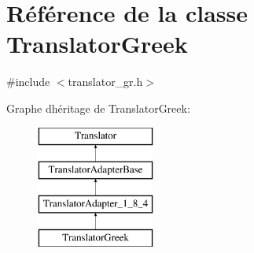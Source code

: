 \hypertarget{class_translator_greek}{}\section{Référence de la classe Translator\+Greek}
\label{class_translator_greek}


{\ttfamily \#include $<$translator\+\_\+gr.\+h$>$}

Graphe d\textquotesingle{}héritage de Translator\+Greek\+:\begin{figure}[H]
\begin{center}
\leavevmode
\includegraphics[height=4.000000cm]{class_translator_greek}
\end{center}
\end{figure}
